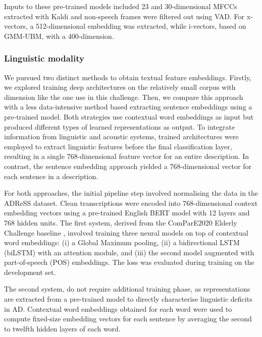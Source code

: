 Inputs to these pre-trained models included 23 and 30-dimensional \acp{MFCC} extracted with Kaldi \cite{kaldi} and non-speech frames were filtered out using \ac{VAD}. For x-vectors, a 512-dimensional embedding was extracted, while i-vectors, based on \ac{GMM-UBM}, with a 400-dimension.
\subsubsection{Linguistic modality}
We pursued two distinct methods to obtain textual feature embeddings. Firstly, we explored training deep architectures on the relatively small corpus with dimension like the one use in this challenge. Then, we compare this approach with a less data-intensive method based extracting sentence embeddings using a pre-trained model. Both strategies use contextual word embeddings as input but produced different types of learned representations as output. To integrate information from linguistic and acoustic systems, trained architectures were employed to extract linguistic features before the final classification layer, resulting in a single 768-dimensional feature vector for an entire description. In contrast, the sentence embedding approach yielded a 768-dimensional vector for each sentence in a description.

For both approaches, the initial pipeline step involved normalising the data in the ADReSS dataset. Clean transcriptions were encoded into 768-dimensional context embedding vectors using a pre-trained English BERT model with 12 layers and 768 hidden units. The first system, derived from the ComParE2020 Elderly Challenge baseline \cite{schuller2020interspeech}, involved training three neural models on top of contextual word embeddings: (i) a Global Maximum pooling, (ii) a bidirectional \ac{LSTM} (biLSTM) with an attention module, and (iii) the second model augmented with part-of-speech (POS) embeddings. The loss was evaluated during training on the development set.

The second system, do not require additional training phase, as representations are extracted from a pre-trained model to directly characterise linguistic deficits in \ac{AD}. Contextual word embeddings obtained for each word were used to compute fixed-size embedding vectors for each sentence by averaging the second to twelfth hidden layers of each word.
